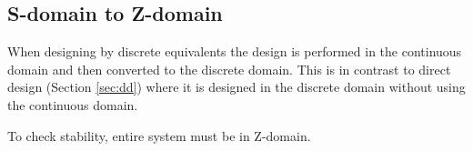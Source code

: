 \documentclass{article}
\newcommand{\sincludepdf}[2][]{
	
}
\begin{document}
\subsection{S-domain to Z-domain}

When designing by discrete equivalents the design is performed
in the continuous domain and then converted to the discrete domain.
This is in contrast to direct design (Section \ref{sec:dd}) where
it is designed in the discrete domain without using the continuous domain.

To check stability, entire system must be in Z-domain.



\sincludepdf[pages={10},
			pagecommand=\subsubsection{Mapping: $z=e^{sT}$}\subsubsection*{Example 1}
		]{scan/11221301.pdf}

\sincludepdf[pages={9},
			pagecommand=\subsubsection{Mapping: Forward, Backward, Trapezoid}\paragraph{Example 1}
	]{scan/11211301.pdf}

\sincludepdf[pages={10},
			pagecommand=\paragraph{Example 2}
	]{scan/11211301.pdf}

\sincludepdf[pages={8},
			pagecommand=\subsubsection*{Example 3}
		]{scan/11221301.pdf}

\sincludepdf[pages={9},
			pagecommand=\subsubsection*{Example 4}
		]{scan/11221301.pdf}
\end{document}
